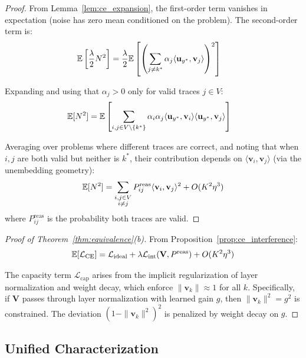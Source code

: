 \begin{proof}
From Lemma~\ref{lem:ce_expansion}, the first-order term vanishes in expectation (noise has zero mean conditioned on the problem). The second-order term is:
\begin{align}
\mathbb{E}\left[\frac{\lambda}{2} N^2\right] &= \frac{\lambda}{2} \mathbb{E}\left[\left(\sum_{j \neq k^*} \alpha_j \langle \mathbf{u}_{y^*}, \mathbf{v}_j \rangle\right)^2\right]
\end{align}

Expanding and using that $\alpha_j > 0$ only for valid traces $j \in V$:
\begin{align}
\mathbb{E}[N^2] &= \mathbb{E}\left[\sum_{i, j \in V \setminus \{k^*\}} \alpha_i \alpha_j \langle \mathbf{u}_{y^*}, \mathbf{v}_i \rangle \langle \mathbf{u}_{y^*}, \mathbf{v}_j \rangle\right]
\end{align}

Averaging over problems where different traces are correct, and noting that when $i, j$ are both valid but neither is $k^*$, their contribution depends on $\langle \mathbf{v}_i, \mathbf{v}_j \rangle$ (via the unembedding geometry):
\begin{equation}
\mathbb{E}[N^2] = \sum_{\substack{i, j \in V \\ i \neq j}} P^{\text{reas}}_{ij} \langle \mathbf{v}_i, \mathbf{v}_j \rangle^2 + O(K^2\eta^3)
\end{equation}
where $P^{\text{reas}}_{ij}$ is the probability both traces are valid.
\end{proof}

\begin{proof}[Proof of Theorem~\ref{thm:equivalence}(b)]
From Proposition~\ref{prop:ce_interference}:
\begin{equation}
\mathbb{E}[\mathcal{L}_{\text{CE}}] = \mathcal{L}_{\text{ideal}} + \lambda \mathcal{L}_{\text{int}}(\mathbf{V}, P^{\text{reas}}) + O(K^2\eta^3)
\end{equation}

The capacity term $\mathcal{L}_{\text{cap}}$ arises from the implicit regularization of layer normalization and weight decay, which enforce $\|\mathbf{v}_k\| \approx 1$ for all $k$. Specifically, if $\mathbf{V}$ passes through layer normalization with learned gain $g$, then $\|\mathbf{v}_k\|^2 = g^2$ is constrained. The deviation $(1 - \|\mathbf{v}_k\|^2)^2$ is penalized by weight decay on $g$.
\end{proof}

\subsection{Unified Characterization}

